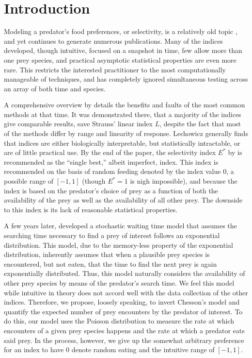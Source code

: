 \section{Introduction}
\label{sec:intro}

Modeling a predator's food preferences, or selectivity, is a relatively old topic \citep{Ivlev:1964,Jacobs:1974,Chesson:1978,Strauss:1979,Vanderploeg:1979,Chesson:1983}, and yet continues to generate numerous publications.  Many of the indices developed, though intuitive, focused on a snapshot in time, few allow more than one prey species, and practical asymptotic statistical properties are even more rare.  This restricts the interested practitioner to the most computationally manageable of techniques, and has completely ignored simultaneous testing across an array of both time and species.

A comprehensive overview by \citet{Lechowicz:1982} details the benefits and faults of the most common methods at that time.  It was demonstrated there, that a majority of the indices give comparable results, save Strauss' linear index $L$, despite the fact that most of the methods differ by range and linearity of response.  Lechowicz generally finds that indices are either biologically interpretable, but statistically intractable, or are of little practical use.  By the end of the paper, the selectivity index $E^*$ by \citet{Vanderploeg:1979} is recommended as the ``single best,'' albeit imperfect, index.  This index is recommended on the basis of random feeding denoted by the index value $0$, a possible range of $[-1,1]$ (though $E^*=1$ is nigh impossible), and because the index is based on the predator's choice of prey as a function of both the availability of the prey as well as the availability of all other prey.  The downside to this index is its lack of reasonable statistical properties.

A few years later, \citet{Chesson:1983} developed a stochastic waiting time model that assumes the searching time necessary to find a prey of interest follows an exponential distribution.  This model, due to the memory-less property of the exponential distribution, inherently assumes that when a plausible prey species is encountered, but not eaten, that the time to find the next prey is again exponentially distributed.  Thus, this model naturally considers the availability of other prey species by means of the predator's search time.  We feel this model while intuitive in theory does not accord well with the data collection of the other indices.  Therefore, we propose, loosely speaking, to invert Chesson's model and quantify the expected number of prey encounters by the predator of interest.  To do this, our model uses the Poisson distribution to measure the rate at which encounters of a given prey species happens and the rate at which a predator eats said prey.  In the process, however, we give up the somewhat arbitrary preference for an index to have $0$ denote random eating and the intuitive range of $[-1,1]$.  

